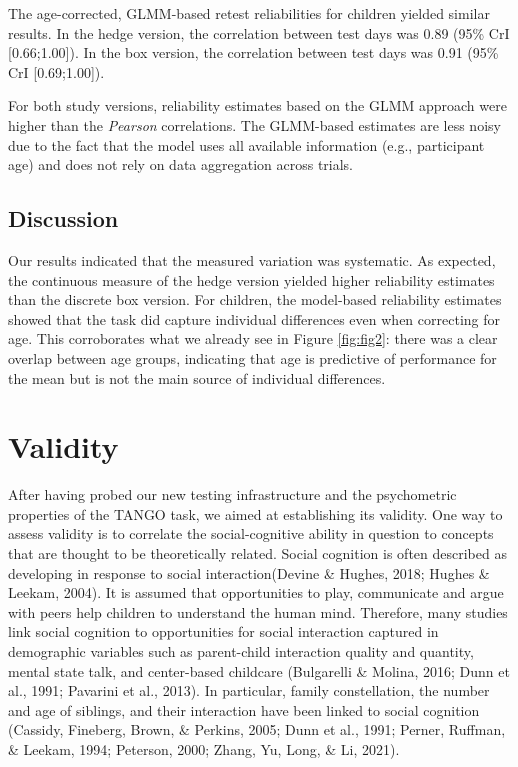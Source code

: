 \documentclass[
  man,floatsintext]{apa7}
\begin{document}
The age-corrected, GLMM-based retest reliabilities for children yielded similar results.
In the hedge version, the correlation between test days was 0.89 (95\% CrI {[}0.66;1.00{]}).
In the box version, the correlation between test days was 0.91 (95\% CrI {[}0.69;1.00{]}).

For both study versions, reliability estimates based on the GLMM approach were higher than the \emph{Pearson} correlations.
The GLMM-based estimates are less noisy due to the fact that the model uses all available information (e.g., participant age) and does not rely on data aggregation across trials.

\hypertarget{discussion-1}{%
\subsection{Discussion}\label{discussion-1}}

Our results indicated that the measured variation was systematic.
As expected, the continuous measure of the hedge version yielded higher reliability estimates than the discrete box version.
For children, the model-based reliability estimates showed that the task did capture individual differences even when correcting for age.
This corroborates what we already see in Figure \ref{fig:fig2}: there was a clear overlap between age groups, indicating that age is predictive of performance for the mean but is not the main source of individual differences.

\hypertarget{validity}{%
\section{Validity}\label{validity}}

After having probed our new testing infrastructure and the psychometric properties of the TANGO task, we aimed at establishing its validity.
One way to assess validity is to correlate the social-cognitive ability in question to concepts that are thought to be theoretically related.
Social cognition is often described as developing in response to social interaction(Devine \& Hughes, 2018; Hughes \& Leekam, 2004).
It is assumed that opportunities to play, communicate and argue with peers help children to understand the human mind.
Therefore, many studies link social cognition to opportunities for social interaction captured in demographic variables such as parent-child interaction quality and quantity, mental state talk, and center-based childcare (Bulgarelli \& Molina, 2016; Dunn et al., 1991; Pavarini et al., 2013).
In particular, family constellation, the number and age of siblings, and their interaction have been linked to social cognition (Cassidy, Fineberg, Brown, \& Perkins, 2005; Dunn et al., 1991; Perner, Ruffman, \& Leekam, 1994; Peterson, 2000; Zhang, Yu, Long, \& Li, 2021).
\end{document}
